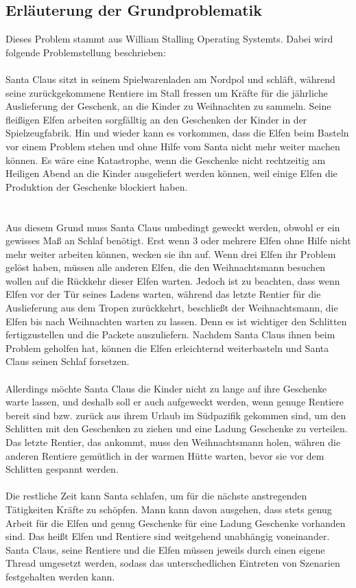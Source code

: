 \documentclass[a4paper,12pt]{article}
\begin{document}
\subsection{Erläuterung der Grundproblematik}
Dieses Problem stammt aus William Stalling Operating Systemts. Dabei wird folgende Problemstellung beschrieben:\\ 
\\Santa Claus sitzt in seinem Spielwarenladen am Nordpol und schläft, während seine zurückgekommene Rentiere im Stall fressen
um Kräfte für die jährliche Auslieferung der Geschenk, an die Kinder zu Weihnachten zu sammeln. Seine fleißigen Elfen arbeiten sorgfälltig an den Geschenken der Kinder
in der Spielzeugfabrik. Hin und wieder kann es vorkommen, dass die Elfen beim Basteln vor einem Problem stehen und ohne Hilfe vom Santa nicht mehr weiter machen können.
Es wäre eine Katastrophe, wenn die Geschenke nicht rechtzeitig am Heiligen Abend an die Kinder ausgeliefert werden können, weil einige Elfen die Produktion der Geschenke blockiert haben. \\\\
\\Aus diesem Grund muss Santa Claus umbedingt geweckt werden, obwohl er ein gewisses Maß an Schlaf benötigt. Erst wenn 3 oder mehrere Elfen ohne Hilfe nicht mehr weiter arbeiten können, wecken sie ihn auf.
Wenn drei Elfen ihr Problem gelöst haben, müssen alle anderen Elfen, die den Weihnachtsmann besuchen wollen auf die Rückkehr dieser Elfen warten.
Jedoch ist zu beachten, dass wenn Elfen vor der Tür seines Ladens warten, während das letzte Rentier für die Auslieferung aus dem Tropen zurückkehrt, beschließt der Weihnachtsmann, die Elfen bis nach Weihnachten warten zu lassen. Denn es ist wichtiger den Schlitten
fertigzustellen und die Packete auszuliefern.
Nachdem Santa Claus ihnen beim Problem geholfen hat, können die Elfen erleichternd weiterbasteln und Santa Claus seinen Schlaf forsetzen.\\
\\Allerdings möchte Santa Claus die Kinder nicht zu lange auf ihre Geschenke warte lassen, und deshalb soll er auch aufgeweckt werden, wenn genuge Rentiere bereit sind bzw. zurück aus ihrem Urlaub im Südpazifik gekommen sind, um den 
Schlitten mit den Geschenken zu ziehen und eine Ladung Geschenke zu verteilen. Das letzte Rentier, das ankommt, muss den Weihnachtsmann holen, währen die anderen Rentiere gemütlich in der warmen Hütte warten, bevor sie vor dem Schlitten gespannt werden.\\
\\Die restliche Zeit kann Santa schlafen, um für die nächste anstregenden Tätigkeiten Kräfte zu schöpfen. Mann kann davon ausgehen, dass stets genug Arbeit für die Elfen und genug Geschenke für eine Ladung Geschenke vorhanden sind.
Das heißt Elfen und Rentiere sind weitgehend unabhängig voneinander. Santa Claus, seine Rentiere und die Elfen müssen jeweils durch einen eigene Thread umgesetzt werden, sodass das unterschedlichen Eintreten von Szenarien festgehalten werden kann.
\end{document}
